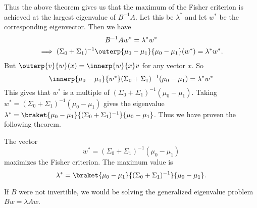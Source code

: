 Thus the above theorem gives us that the maximum of the Fisher criterion
is achieved at the largest eigenvalue of $B^{-1}A$.
Let this be $\lambda^*$ and let $w^*$ be the corresponding eigenvector.
Then we have \begin{gather*}
    B^{-1} A w^* = \lambda^* w^* \\
    \implies (\Sigma_0 + \Sigma_1)^{-1} \outerp{\mu_0 - \mu_1}{\mu_0 - \mu_1} (w^*) = \lambda^* w^*.
\end{gather*}
But $\outerp{v}{w}(x) = \innerp{w}{x}v$ for any vector $x$.
So \[
    \innerp{\mu_0 - \mu_1}{w^*} (\Sigma_0 + \Sigma_1)^{-1} (\mu_0 - \mu_1)
        = \lambda^* w^*
\]
This gives that $w^*$ is a multiple of $(\Sigma_0 + \Sigma_1)^{-1} (\mu_0 - \mu_1)$.
Taking $w^* = (\Sigma_0 + \Sigma_1)^{-1} (\mu_0 - \mu_1)$ gives the
eigenvalue $\lambda^* = \braket{\mu_0 - \mu_1}{(\Sigma_0 + \Sigma_1)^{-1}}{\mu_0 - \mu_1}$.
Thus we have proven the following theorem.

\begin{theorem*} \label{thm:fisher}
    The vector \[
        w^* = (\Sigma_0 + \Sigma_1)^{-1} (\mu_0 - \mu_1)
    \] maximizes the Fisher criterion.
    The maximum value is \[
        \lambda^* =
        \braket{\mu_0 - \mu_1}{(\Sigma_0 + \Sigma_1)^{-1}}{\mu_0 - \mu_1}.
    \]
\end{theorem*}

If $B$ were not invertible, we would be solving the generalized eigenvalue
problem $Bw = \lambda Aw$.
